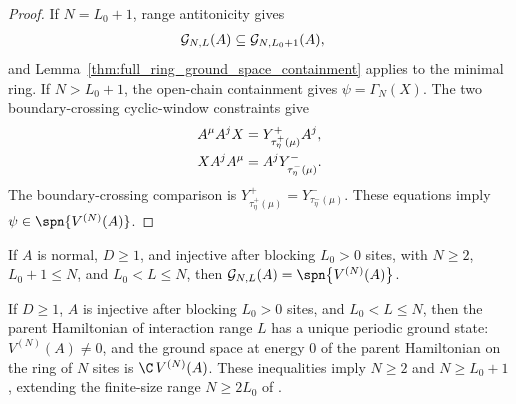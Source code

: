 \begin{proof}
    \leanok
    If $N=L_0+1$, range antitonicity gives
    \begin{align}
        \mathcal G_{N,L}(A)
         & \subseteq\mathcal G_{N,L_0+1}(A),
        \notag
    \end{align}
    and Lemma~\ref{thm:full_ring_ground_space_containment} applies to the
    minimal ring. If $N>L_0+1$, the open-chain containment gives
    $\psi=\Gamma_N(X)$. The two boundary-crossing cyclic-window constraints give
    \begin{align}
        A^\mu A^j X
         & =
        Y^+_{\tau^+_\eta(\mu)}A^j,
        \notag \\
        X A^j A^\mu
         & =
        A^jY^-_{\tau^-_\eta(\mu)}.
        \notag
    \end{align}
    The boundary-crossing comparison is
    $Y^+_{\tau^+_\eta(\mu)}=Y^-_{\tau^-_\eta(\mu)}$. These equations imply
    $\psi \in \spn\{V^{(N)}(A)\}$.
\end{proof}

\begin{lemma}%
    \label{thm:chain_ground_space_eq_mpv_normal}
    \leanok
    If $A$ is normal, $D \ge 1$, and injective after blocking $L_0>0$ sites,
    with $N \ge 2$, $L_0+1\le N$, and $L_0 < L \le N$, then
    $\mathcal G_{N,L}(A) = \spn\bigl\{V^{(N)}(A)\bigr\}$.
\end{lemma}

\begin{theorem}%
    \label{thm:parent_hamiltonian_unique_gs}
    \leanok
    If $D \ge 1$, $A$ is injective after blocking $L_0>0$ sites, and
    $L_0 < L \le N$, then the parent Hamiltonian of interaction range $L$ has
    a unique periodic ground state: $V^{(N)}(A)\ne0$, and the ground space at
    energy $0$ of the parent Hamiltonian on the ring of $N$ sites is
    $\C\,V^{(N)}(A)$. These inequalities imply $N\ge2$ and
    $N\ge L_0+1$, extending the finite-size range $N\ge 2L_0$ of
    \cite[Theorem~10]{PerezGarcia2007Matrix}.
\end{theorem}

